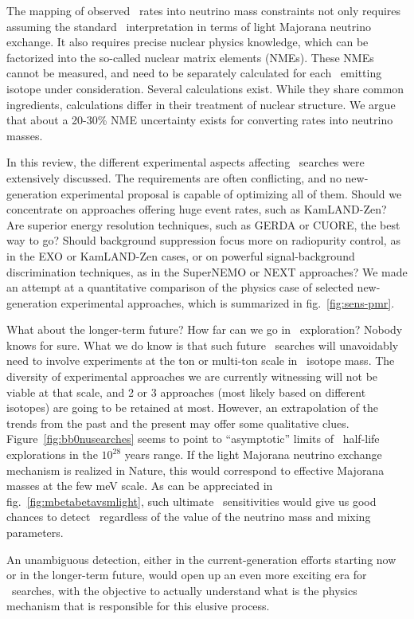 The mapping of observed \bbonu\ rates into neutrino mass constraints not only requires assuming the standard \bbonu\ interpretation in terms of light Majorana neutrino exchange. It also requires precise nuclear physics knowledge, which can be factorized into the so-called nuclear matrix elements (NMEs). These NMEs cannot be measured, and need to be separately calculated for each \bb\ emitting isotope under consideration. Several calculations exist. While they share common ingredients, calculations differ in their treatment of nuclear structure. We argue that about a 20-30\% NME uncertainty exists for converting rates into neutrino masses. 

In this review, the different experimental aspects affecting \bbonu\ searches were extensively discussed. The requirements are often conflicting, and no new-generation experimental proposal is capable of optimizing all of them. Should we concentrate on approaches offering huge event rates, such as KamLAND-Zen? Are superior energy resolution techniques, such as GERDA or CUORE, the best way to go? Should background suppression focus more on radiopurity control, as in the EXO or KamLAND-Zen cases, or on powerful signal-background discrimination techniques, as in the SuperNEMO or NEXT approaches? We made an attempt at a quantitative comparison of the physics case of selected new-generation experimental approaches, which is summarized in fig.~\ref{fig:sens-pmr}. 

What about the longer-term future? How far can we go in \bbonu\ exploration? Nobody knows for sure. What we do know is that such future \bbonu\ searches will unavoidably need to involve experiments at the ton or multi-ton scale in \bb\ isotope mass. The diversity of experimental approaches we are currently witnessing will not be viable at that scale, and 2 or 3 approaches (most likely based on different isotopes) are going to be retained at most. However, an extrapolation of the trends from the past and the present may offer some qualitative clues. Figure~\ref{fig:bb0nusearches} seems to point to ``asymptotic'' limits of \bbonu\ half-life explorations in the $10^{28}$ years range. If the light Majorana neutrino exchange mechanism is realized in Nature, this would correspond to effective Majorana masses at the few meV scale. As can be appreciated in fig.~\ref{fig:mbetabetavsmlight}, such ultimate \bbonu\ sensitivities would give us good chances to detect \bbonu\ regardless of the value of the neutrino mass and mixing parameters. 

An unambiguous detection, either in the current-generation efforts starting now or in the longer-term future, would open up an even more exciting era for \bbonu\ searches, with the objective to actually understand what is the physics mechanism that is responsible for this elusive process.



  

